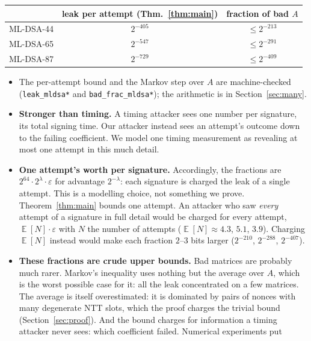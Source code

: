 \documentclass[11pt]{article}
\theoremstyle{definition}
\theoremstyle{remark}
\newcommand{\E}{\mathop{\mathbb{E}}}
\newcommand{\lean}[1]{\texttt{#1}}
\begin{document}
\begin{center}\small
\begin{tabular}{@{}lcc@{}}
\toprule
 & leak per attempt (Thm.~\ref{thm:main}) & fraction of bad $A$ \\
\midrule
ML-DSA-44 & $2^{-405}$ & $\le 2^{-213}$ \\
ML-DSA-65 & $2^{-547}$ & $\le 2^{-291}$ \\
ML-DSA-87 & $2^{-729}$ & $\le 2^{-409}$ \\
\bottomrule
\end{tabular}
\end{center}

\begin{itemize}
  \item The per-attempt bound and the Markov step over $A$ are machine-checked
        (\lean{leak\_mldsa*} and \lean{bad\_frac\_mldsa*}); the arithmetic is in
        Section~\ref{sec:many}.
  \item \textbf{Stronger than timing.} A timing attacker sees one number per signature, its total
        signing time. Our attacker instead sees an attempt's outcome down to the failing
        coefficient. We model one timing measurement as revealing at most one attempt in this much
        detail.
  \item \textbf{One attempt's worth per signature.} Accordingly, the fractions are
        $2^{64}\cdot2^{\lambda}\cdot\varepsilon$ for advantage $2^{-\lambda}$: each signature is charged the leak of a single
        attempt. This is a modelling choice, not something we prove. Theorem~\ref{thm:main}
        bounds one attempt. An attacker who saw \emph{every} attempt of a signature in full
        detail would be charged for every attempt, $\E[N]\cdot\varepsilon$ with $N$ the number of
        attempts ($\E[N]\approx4.3$, $5.1$, $3.9$). Charging $\E[N]$ instead would make each
        fraction $2$--$3$ bits larger ($2^{-210}$, $2^{-288}$, $2^{-407}$).
  \item \textbf{These fractions are crude upper bounds.} Bad matrices are probably much rarer.
        Markov's inequality uses nothing but the average over $A$, which is the worst possible
        case for it: all the leak concentrated on a few matrices. The average is itself
        overestimated: it is dominated by pairs of nonces with many degenerate NTT slots, which
        the proof charges the trivial bound (Section~\ref{sec:proof}). And the bound charges for
        information a timing attacker never sees: which coefficient failed. Numerical experiments put

\end{itemize}
\end{document}
